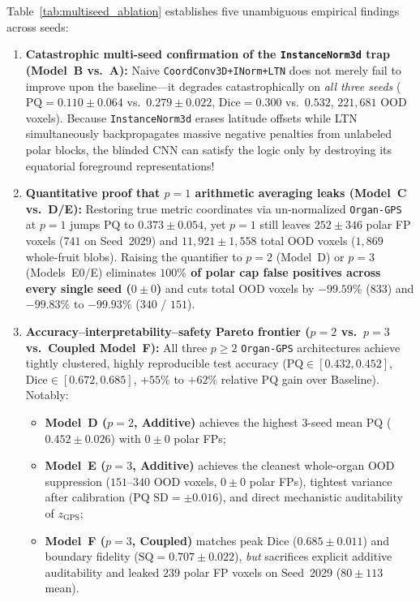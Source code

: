 \documentclass[10pt,a4paper]{article}
\renewcommand{\_}{\origunderscore\allowbreak}
\begin{document}
Table~\ref{tab:multiseed_ablation} establishes five unambiguous empirical findings across seeds:
\begin{enumerate}
    \item \textbf{Catastrophic multi-seed confirmation of the \texttt{InstanceNorm3d} trap (Model~B vs.\ A):} Naive \texttt{CoordConv3D+INorm+LTN} does not merely fail to improve upon the baseline---it degrades catastrophically on \emph{all three seeds} ($\text{PQ} = 0.110 \pm 0.064$ vs.\ $0.279 \pm 0.022$, $\text{Dice} = 0.300$ vs.\ $0.532$, $221{,}681$ OOD voxels). Because \texttt{InstanceNorm3d} erases latitude offsets while LTN simultaneously backpropagates massive negative penalties from unlabeled polar blocks, the blinded CNN can satisfy the logic only by destroying its equatorial foreground representations!
    \item \textbf{Quantitative proof that $p = 1$ arithmetic averaging leaks (Model~C vs.\ D/E):} Restoring true metric coordinates via un-normalized \texttt{Organ-GPS} at $p = 1$ jumps $\text{PQ}$ to $0.373 \pm 0.054$, yet $p = 1$ still leaves $252 \pm 346$ polar FP voxels ($741$ on Seed~2029) and $11{,}921 \pm 1{,}558$ total OOD voxels ($1{,}869$ whole-fruit blobs). Raising the quantifier to $p = 2$ (Model~D) or $p = 3$ (Models~E0/E) eliminates \textbf{$100\%$ of polar cap false positives across every single seed ($0 \pm 0$)} and cuts total OOD voxels by $-99.59\%$ ($833$) and $-99.83\%$ to $-99.93\%$ ($340$ / $151$).
    \item \textbf{Accuracy--interpretability--safety Pareto frontier ($p=2$ vs.\ $p=3$ vs.\ Coupled Model~F):} All three $p \ge 2$ \texttt{Organ-GPS} architectures achieve tightly clustered, highly reproducible test accuracy ($\text{PQ} \in [0.432, 0.452]$, $\text{Dice} \in [0.672, 0.685]$, $+55\%$ to $+62\%$ relative $\text{PQ}$ gain over Baseline). Notably:
    \begin{itemize}
        \item \textbf{Model~D ($p=2$, Additive)} achieves the highest 3-seed mean $\text{PQ}$ ($0.452 \pm 0.026$) with $0 \pm 0$ polar FPs;
        \item \textbf{Model~E ($p=3$, Additive)} achieves the cleanest whole-organ OOD suppression ($151$--$340$ OOD voxels, $0 \pm 0$ polar FPs), tightest variance after calibration ($\text{PQ SD} = \pm 0.016$), and direct mechanistic auditability of $z_{\text{GPS}}$;
        \item \textbf{Model~F ($p=3$, Coupled)} matches peak $\text{Dice}$ ($0.685 \pm 0.011$) and boundary fidelity ($\text{SQ} = 0.707 \pm 0.022$), \emph{but} sacrifices explicit additive auditability and leaked $239$ polar FP voxels on Seed~2029 ($80 \pm 113$ mean).

\end{itemize}
\end{enumerate}
\end{document}
